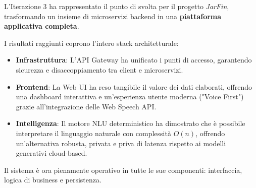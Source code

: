 L'Iterazione 3 ha rappresentato il punto di svolta per il progetto \textit{JarFin}, trasformando un insieme di microservizi backend in una \textbf{piattaforma applicativa completa}.

I risultati raggiunti coprono l'intero stack architetturale:
\begin{itemize}
    \item \textbf{Infrastruttura}: L'API Gateway ha unificato i punti di accesso, garantendo sicurezza e disaccoppiamento tra client e microservizi.
    \item \textbf{Frontend}: La Web UI ha reso tangibile il valore dei dati elaborati, offrendo una dashboard interattiva e un'esperienza utente moderna ("Voice First") grazie all'integrazione delle Web Speech API.
    \item \textbf{Intelligenza}: Il motore NLU deterministico ha dimostrato che è possibile interpretare il linguaggio naturale con complessità $O(n)$, offrendo un'alternativa robusta, privata e priva di latenza rispetto ai modelli generativi cloud-based.
\end{itemize}

Il sistema è ora pienamente operativo in tutte le sue componenti: interfaccia, logica di business e persistenza.
